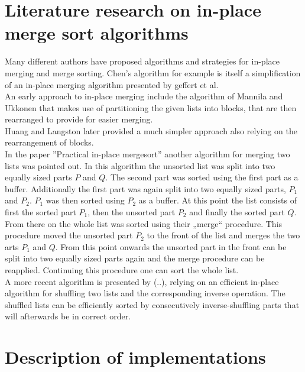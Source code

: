 \documentclass[11pt,pdftex,a4paper, twocolumn]{article}
\begin{document}
\section*{Literature research on in-place merge sort algorithms}
Many different authors have proposed algorithms and strategies for in-place merging and merge sorting. Chen’s algorithm for example is itself a simplification of an in-place merging algorithm presented by geffert et al\cite{geffert2000asymptotically}. \\
An early approach to in-place merging include the algorithm of Mannila and Ukkonen\cite{mannila1984simple} that makes use of partitioning the given lists into blocks, that are then rearranged to provide for easier merging. \\
Huang and Langston later provided a much simpler approach also relying on the rearrangement of blocks. \\
In the paper ''Practical in-place mergesort''\cite{dalkilic2011simple} another algorithm for merging two lists was pointed out. In this algorithm the unsorted list was split into two equally sized parts $ P $ and $ Q $. The second part was sorted using the first part as a buffer. Additionally the first part was again split into two equally sized parts, $ P_1 $ and $ P_2 $. $ P_1 $ was then sorted using $ P_2 $ as a buffer. At this point the list consists of first the sorted part $ P_1 $, then the unsorted part $ P_2 $ and finally the sorted part $ Q $. From there on the whole list was sorted using their „merge“ procedure. This procedure moved the unsorted part $ P_2 $ to the front of the list and merges the two arts $ P_1 $ and $ Q $. From this point onwards the unsorted part in the front can be split into two equally sized parts again and the merge procedure can be reapplied. Continuing this procedure one can sort the whole list. \\
A more recent algorithm is presented by (..)\cite{dalkilic2011simple}, relying on an efficient in-place algorithm for shuffling two lists and the corresponding inverse operation. The shuffled lists can be efficiently sorted by consecutively inverse-shuffling parts that will afterwards be in correct order. 

\section*{Description of implementations}
\end{document}
